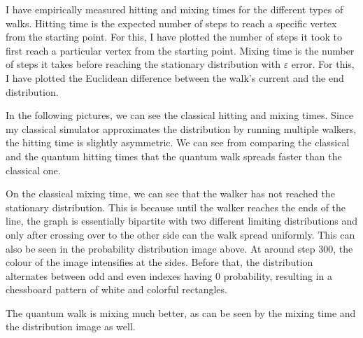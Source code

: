 I have empirically measured hitting and mixing times for the different types of walks. Hitting time
is the expected number of steps to reach a specific vertex from the starting point. For this, I have
plotted the number of steps it took to first reach a particular vertex from the starting point. Mixing
time is the number of steps it takes before reaching the stationary distribution with $\varepsilon$ error.
For this, I have plotted the Euclidean difference between the walk's current and the end distribution.

In the following pictures, we can see the classical hitting and mixing times. Since my classical simulator approximates the distribution by running multiple walkers, the hitting time is slightly asymmetric. We can see from comparing the classical and the quantum hitting times that the quantum walk spreads faster than the classical one.

On the classical mixing time, we can see that the walker has not reached the stationary distribution. This is because until the walker reaches the ends of the line, the graph is essentially bipartite with two different limiting distributions and only after crossing over to the other side can the walk spread uniformly. This can also be seen in the probability distribution image above. At around step $300$, the colour of the image intensifies at the sides. Before that, the distribution alternates between odd and even indexes having $0$ probability, resulting in a chessboard pattern of white and colorful rectangles.

The quantum walk is mixing much better, as can be seen by the mixing time and the distribution image as well.

